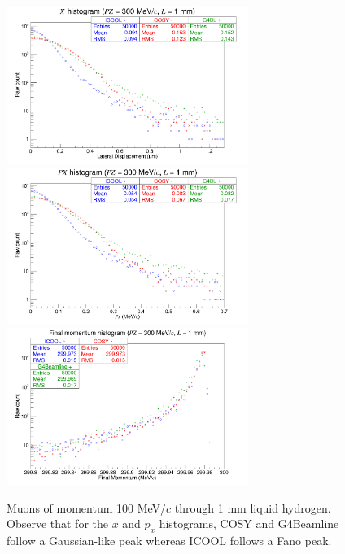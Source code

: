 \begin{figure}[H]
  \centering
    \includegraphics[width=0.7\textwidth]{Benchmarking/LH/X.300.1.png} 
    \includegraphics[width=0.7\textwidth]{Benchmarking/LH/PX.300.1.png} 
    \includegraphics[width=0.7\textwidth]{Benchmarking/LH/strag.300.1.png} 
  \caption[Muons of momentum 100 MeV/$c$ through 1 mm liquid hydrogen.]{Muons of momentum 100 MeV/$c$ through 1 mm liquid hydrogen. Observe that for the $x$ and $p_x$ histograms, COSY and G4Beamline follow a Gaussian-like peak whereas ICOOL follows a Fano peak.}
  \label{fig:300.1}
\end{figure}


